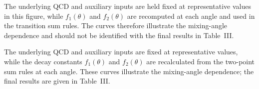 
The underlying QCD and auxiliary inputs are held fixed at representative
values in this figure, while $f_1(\theta)$ and $f_2(\theta)$ are recomputed
at each angle and used in the transition sum rules. The curves therefore
illustrate the mixing-angle dependence and should not be identified with
the final results in Table~III.

The underlying QCD and auxiliary inputs are fixed at representative values,
while the decay constants $f_1(\theta)$ and $f_2(\theta)$ are recalculated
from the two-point sum rules at each angle. These curves illustrate the
mixing-angle dependence; the final results are given in Table~III.

